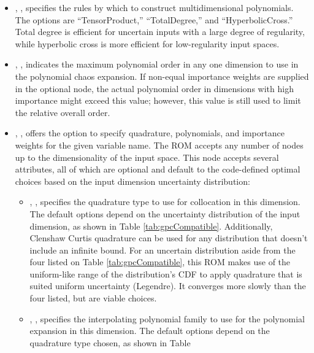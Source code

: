 \begin{itemize}
  \item {}, ,
  specifies the rules by which to construct multidimensional polynomials.  The options are
  ``TensorProduct,'' ``TotalDegree,'' and ``HyperbolicCross.''  
  Total degree is efficient for
  uncertain inputs with a large degree of regularity, while hyperbolic cross is more efficient
  for low-regularity input spaces.
  \item {}, ,
  indicates the maximum polynomial order in any one dimension to use in the
  polynomial chaos expansion. \nb If non-equal importance weights are supplied in the optional
   node, the actual polynomial order in dimensions with high
  importance might exceed this value; however, this value is still used to limit the 
  relative overall order.
  \item {}, ,
  offers the option to specify quadrature, polynomials, and importance weights for the given
  variable name.  The ROM accepts any number of  nodes up to the 
  dimensionality of the input space.  This node accepts several attributes, all of which are 
  optional and default to
  the code-defined optimal choices based on the input dimension uncertainty distribution:
  \begin{itemize}
    \item {}, ,
      specifies the quadrature type to use for collocation in this dimension.  The default options 
      depend on the uncertainty distribution of the input dimension, as shown in Table 
      \ref{tab:gpcCompatible}. Additionally, Clenshaw Curtis quadrature can be used for any
      distribution that doesn't include an infinite bound.
      \nb For an uncertain distribution aside from the four listed on Table
      \ref{tab:gpcCompatible}, this ROM
      makes use of the uniform-like range of the distribution's CDF to apply quadrature that is
      suited uniform uncertainty (Legendre).  It converges more slowly than the four listed, but are
      viable choices. 
    \item {}, ,
      specifies the interpolating polynomial family to use for the polynomial expansion in this 
      dimension.  The default options depend on the quadrature type chosen, as shown in Table

\end{itemize}
\end{itemize}
